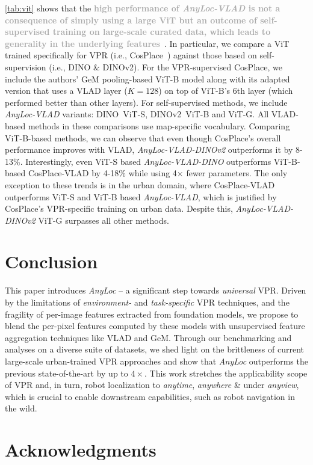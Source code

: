 \documentclass[letterpaper, 10 pt, conference]{ieeeconf}  \fi
\newcommand{\highlight}[1]{\textcolor{darkgray}{\textbf{#1}}}
\newcommand{\coolname}{\textit{AnyLoc}}
\newcommand{\coolagg}[2]{\textit{AnyLoc-{#1}-{#2}}}
\newcommand{\coolaggshort}[1]{\textit{AnyLoc-{#1}}}
\newcommand{\dino}{\mbox{DINO}}
\newcommand{\dinovtwo}{\mbox{DINOv2}}
\begin{document}
\cref{tab:vit} shows that the \highlight{high performance of \coolaggshort{VLAD} is not a consequence of simply using a large ViT but an outcome of self-supervised training on large-scale curated data, which leads to generality in the underlying features}~\cite{oquab2023dinov2}.
In particular, we compare a ViT trained specifically for VPR (i.e., CosPlace~\cite{berton2022rethinking}) against those based on self-supervision (i.e., \dino{} \& \dinovtwo{}).
For the VPR-supervised CosPlace, we include the authors' GeM pooling-based ViT-B model along with its adapted version that uses a VLAD layer ($K = 128$) on top of ViT-B's $6$th layer (which performed better than other layers). 
For self-supervised methods, we include \coolaggshort{VLAD} variants: \dino{}~ViT-S, \dinovtwo{}~ViT-B and ViT-G. 
All VLAD-based methods in these comparisons use map-specific vocabulary.
Comparing ViT-B-based methods, we can observe that even though CosPlace's overall performance improves with VLAD, \coolagg{VLAD}{\dinovtwo{}} outperforms it by 8-13\%.
Interestingly, even ViT-S based \coolagg{VLAD}{\dino{}} outperforms ViT-B-based CosPlace-VLAD by 4-18\% while using 4$\times$ fewer parameters.
The only exception to these trends is in the urban domain, where CosPlace-VLAD outperforms ViT-S and ViT-B based \coolaggshort{VLAD}, which is justified by CosPlace's VPR-specific training on urban data.
Despite this, \coolagg{VLAD}{\dinovtwo{}} ViT-G surpasses all other methods. 
\section{Conclusion}

This paper introduces \coolname{} -- a significant step towards \emph{universal} VPR. Driven by the limitations of \textit{environment-} and \textit{task-specific} VPR techniques, and the fragility of per-image features extracted from foundation models, we propose to blend the per-pixel features computed by these models with unsupervised feature aggregation techniques like VLAD and GeM.
Through our benchmarking and analyses on a diverse suite of datasets, we shed light on the brittleness of current large-scale urban-trained VPR approaches and show that \coolname{} outperforms the previous state-of-the-art by up to $4\times$.
This work stretches the applicability scope of VPR and, in turn, robot localization to \textit{anytime}, \textit{anywhere} \& under \textit{anyview}, which is crucial to enable downstream capabilities, such as robot navigation in the wild. 
\section*{Acknowledgments}
\end{document}
